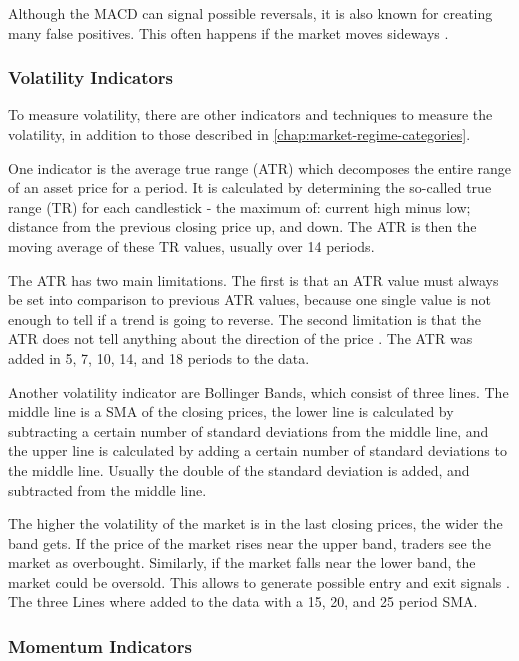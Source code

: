 Although the MACD can signal possible reversals, it is also known for creating many false positives.
This often happens if the market moves sideways \cite{investopia-macd}.

\subsubsection{Volatility Indicators}

To measure volatility, there are other indicators and techniques to measure the volatility, in addition to those described in \autoref{chap:market-regime-categories}.

One indicator is the average true range (ATR) which decomposes the entire range of an asset price for a period.
It is calculated by determining the so-called true range (TR) for each candlestick - the maximum of: current high minus low; distance from the previous closing price up, and down.
The ATR is then the moving average of these TR values, usually over 14 periods.

The ATR has two main limitations.
The first is that an ATR value must always be set into comparison to previous ATR values, because one single value is not enough to tell if a trend is going to reverse.
The second limitation is that the ATR does not tell anything about the direction of the price \cite{investopia-atr}.
The ATR was added in 5, 7, 10, 14, and 18 periods to the data.

Another volatility indicator are Bollinger Bands, which consist of three lines.
The middle line is a SMA of the closing prices, the lower line is calculated by subtracting a certain number of standard deviations from the middle line, and the upper line is calculated by adding a certain number of standard deviations to the middle line.
Usually the double of the standard deviation is added, and subtracted from the middle line.

The higher the volatility of the market is in the last closing prices, the wider the band gets.
If the price of the market rises near the upper band, traders see the market as overbought.
Similarly, if the market falls near the lower band, the market could be oversold.
This allows to generate possible entry and exit signals \cite{investopia-bb}.
The three Lines where added to the data with a 15, 20, and 25 period SMA.

\subsubsection{Momentum Indicators}

